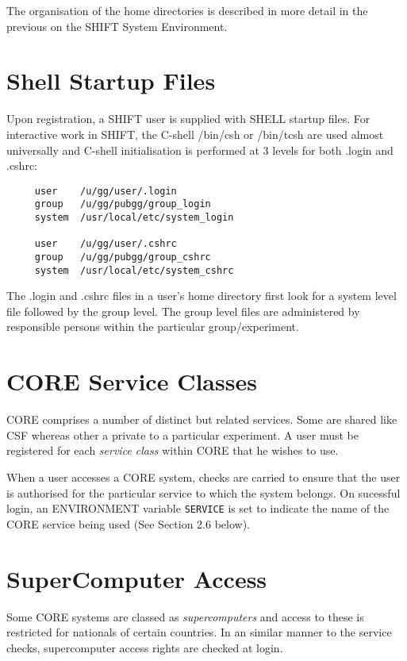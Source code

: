 The organisation of the home directories is described in more detail in the
previous on the SHIFT System Environment.
 
\section {Shell Startup Files}
 
Upon registration, a SHIFT user is supplied with SHELL startup files.
For interactive work in SHIFT, the C-shell /bin/csh or /bin/tcsh are used
almost universally and C-shell initialisation is performed at 3 levels
for both .login and .cshrc:
 
\begin{center}
\begin{verbatim}
     user    /u/gg/user/.login
     group   /u/gg/pubgg/group_login
     system  /usr/local/etc/system_login
 
     user    /u/gg/user/.cshrc
     group   /u/gg/pubgg/group_cshrc
     system  /usr/local/etc/system_cshrc
\end{verbatim}
\end{center}
 
The .login and .cshrc files in a user's home directory
first look for a system level file followed by the group level.
The group level files are administered by responsible persons
within the particular group/experiment.
 
\section {CORE Service Classes}
 
CORE comprises a number of distinct but related services.
Some are shared like CSF whereas other a private to a particular experiment.
A user must be registered for each {\em service class} within CORE that he
wishes to use.
 
When a user accesses a CORE system, checks are carried to ensure that
the user is authorised for the particular service to which the system belongs.
On sucessful login, an ENVIRONMENT variable {\tt SERVICE} is set to indicate
the name of the CORE service being used (See Section 2.6 below).
 
\section {SuperComputer Access}
 
Some CORE systems are classed as {\em supercomputers} and access
to these is restricted for nationals of certain countries.
In an similar manner to the service checks, supercomputer access rights are
checked at login.
 
